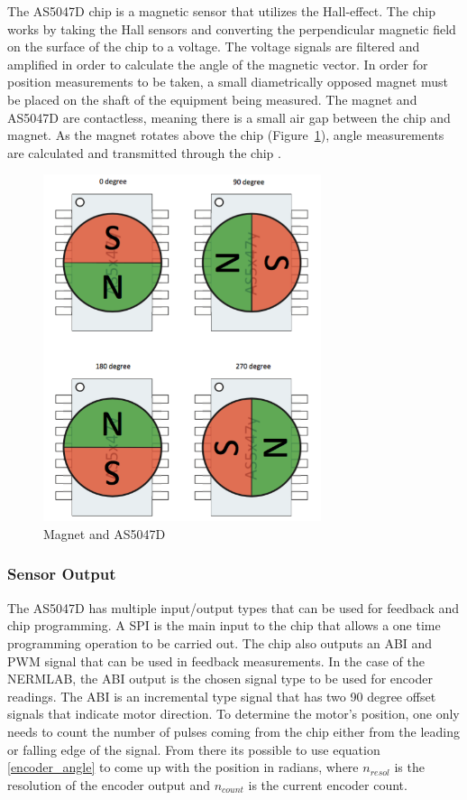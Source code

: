 The AS5047D chip is a magnetic sensor that utilizes the Hall-effect. The chip works by taking the Hall sensors and converting the perpendicular magnetic field on the surface of the chip to a voltage. The voltage signals are filtered and amplified in order to calculate the angle of the magnetic vector. In order for position measurements to be taken, a small diametrically opposed magnet must be placed on the shaft of the equipment being measured. The magnet and AS5047D are contactless, meaning there is a small air gap between the chip and magnet. As the magnet rotates above the chip (Figure~\ref{magnet_rotation}), angle measurements are calculated and transmitted through the chip \citep{1}. 

\begin{figure}[htb]
\begin{center}
    \includegraphics[height=4in]{figures/magnetic_field.png}

    \caption[Magnet and AS5047D]{Magnet and AS5047D \citep{1}}

    \label{magnet_rotation}
\end{center}
\end{figure}

\subsubsection{Sensor Output}
The AS5047D has multiple input/output types that can be used for feedback and chip programming. A \ac{SPI} is the main input to the chip that allows a one time programming operation to be carried out. The chip also outputs an ABI and \ac{PWM} signal that can be used in feedback measurements. In the case of the NERMLAB, the ABI output is the chosen signal type to be used for encoder readings. The ABI is an incremental type signal that has two 90 degree offset signals that indicate motor direction. To determine the motor's position, one only needs to count the number of pulses coming from the chip either from the leading or falling edge of the signal. From there its possible to use equation \ref{encoder_angle} to come up with the position in radians, where $n_{resol}$ is the resolution of the encoder output and $n_{count}$ is the current encoder count.

